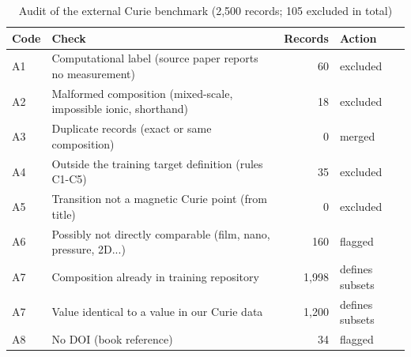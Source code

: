\begin{table}
\caption{Audit of the external Curie benchmark (2,500 records; 105 excluded in total)}
\label{tab:tableS1_benchmark_audit}
\tablefont
\begin{tabularx}{\textwidth}{@{}l>{\raggedright\arraybackslash}Xrl@{}}
\toprule
\textbf{Code} & \textbf{Check} & \textbf{Records} & \textbf{Action} \\
\midrule
A1 & Computational label (source paper reports no measurement) & 60 & excluded \\
A2 & Malformed composition (mixed-scale, impossible ionic, shorthand) & 18 & excluded \\
A3 & Duplicate records (exact or same composition) & 0 & merged \\
A4 & Outside the training target definition (rules C1-C5) & 35 & excluded \\
A5 & Transition not a magnetic Curie point (from title) & 0 & excluded \\
A6 & Possibly not directly comparable (film, nano, pressure, 2D...) & 160 & flagged \\
A7 & Composition already in training repository & 1,998 & defines subsets \\
A7 & Value identical to a value in our Curie data & 1,200 & defines subsets \\
A8 & No DOI (book reference) & 34 & flagged \\
\bottomrule
\end{tabularx}
\end{table}
